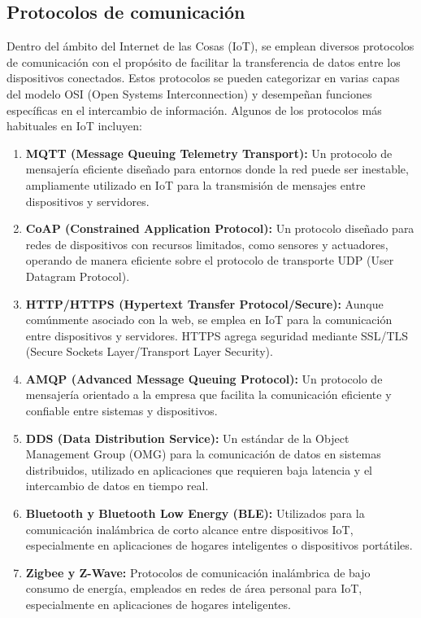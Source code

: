 \documentclass[12pt]{article}
\begin{document}
  \subsection*{Protocolos de comunicación}
  Dentro del ámbito del Internet de las Cosas (IoT), se emplean diversos protocolos de comunicación con el propósito de facilitar la transferencia de datos entre los dispositivos conectados. Estos protocolos se pueden categorizar en varias capas del modelo OSI (Open Systems Interconnection) y desempeñan funciones específicas en el intercambio de información. Algunos de los protocolos más habituales en IoT incluyen:

  \begin{enumerate}
    \item \textbf{MQTT (Message Queuing Telemetry Transport):} Un protocolo de mensajería eficiente diseñado para entornos donde la red puede ser inestable, ampliamente utilizado en IoT para la transmisión de mensajes entre dispositivos y servidores.
    \item \textbf{CoAP (Constrained Application Protocol):} Un protocolo diseñado para redes de dispositivos con recursos limitados, como sensores y actuadores, operando de manera eficiente sobre el protocolo de transporte UDP (User Datagram Protocol).
    \item \textbf{HTTP/HTTPS (Hypertext Transfer Protocol/Secure):} Aunque comúnmente asociado con la web, se emplea en IoT para la comunicación entre dispositivos y servidores. HTTPS agrega seguridad mediante SSL/TLS (Secure Sockets Layer/Transport Layer Security).
    \item \textbf{AMQP (Advanced Message Queuing Protocol):} Un protocolo de mensajería orientado a la empresa que facilita la comunicación eficiente y confiable entre sistemas y dispositivos.
    \item \textbf{DDS (Data Distribution Service):} Un estándar de la Object Management Group (OMG) para la comunicación de datos en sistemas distribuidos, utilizado en aplicaciones que requieren baja latencia y el intercambio de datos en tiempo real.
    \item \textbf{Bluetooth y Bluetooth Low Energy (BLE):} Utilizados para la comunicación inalámbrica de corto alcance entre dispositivos IoT, especialmente en aplicaciones de hogares inteligentes o dispositivos portátiles.
    \item \textbf{Zigbee y Z-Wave:} Protocolos de comunicación inalámbrica de bajo consumo de energía, empleados en redes de área personal para IoT, especialmente en aplicaciones de hogares inteligentes.
  \end{enumerate}
\end{document}
